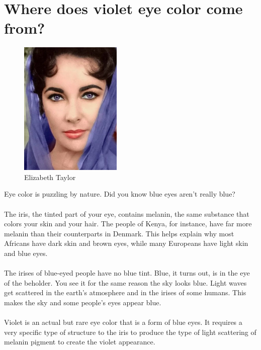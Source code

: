 \documentclass[12pt]{article}
\begin{document}
\section{Where does violet eye color come from?}

\begin{figure}
\centering
    \includegraphics[width=0.435\textwidth]{Elizabeth}
    \caption{Elizabeth Taylor\cite{Elizabeth}}
\end{figure}

Eye color is puzzling by nature. Did you know blue eyes aren’t really blue?
\paragraph{}
The iris, the tinted part of your eye, contains melanin, the same substance that colors your skin and your hair. The people of Kenya, for instance, have far more melanin than their counterparts in Denmark. This helps explain why most Africans have dark skin and brown eyes, while many Europeans have light skin and blue eyes. 
\paragraph{}
The irises of blue-eyed people have no blue tint. Blue, it turns out, is in the eye of the beholder. You see it for the same reason the sky looks blue. Light waves get scattered in the earth’s atmosphere and in the irises of some humans. This makes the sky and some people’s eyes appear blue.  
\paragraph{}
Violet is an actual but rare eye color that is a form of blue eyes. It requires a very specific type of structure to the iris to produce the type of light scattering of melanin pigment to create the violet appearance.
\end{document}
